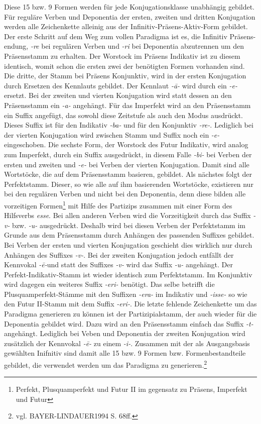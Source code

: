 \documentclass[12pt,abstract=on,titlepage,bibliography=totoc,ngerman,listof=totoc]{scrreprt}
\begin{document}
Diese 15 bzw. 9 Formen werden für jede Konjugationsklasse unabhängig gebildet. Für reguläre Verben und Deponentia der ersten, zweiten und dritten Konjugation werden alle Zeichenkette alleinig aus der Infinitiv-Präsens-Aktiv-Form gebildet. Der erste Schritt auf dem Weg zum vollen Paradigma ist es, die Infinitiv Präsens-endung, \textit{-re} bei regulären Verben und \textit{-ri} bei Deponentia abzutrennen um den Präsensstamm zu erhalten. Der Worstock im Präsens Indikativ ist zu diesem identisch, womit schon die ersten zwei der benötigten Formen vorhanden sind. Die dritte, der Stamm bei Präsens Konjunktiv, wird in der ersten Konjugation durch Ersetzen des Kennlauts gebildet. Der Kennlaut \textit{-ā-} wird durch ein \textit{-e-} ersetzt. Bei der zweiten und vierten Konjugation wird statt dessen an den Präsensstamm ein \textit{-a-} angehängt. Für das Imperfekt wird an den Präsensstamm ein Suffix angefügt, das sowohl diese Zeitstufe als auch den Modus ausdrückt. Dieses Suffix ist für den Indikativ \textit{-ba-} und für den Konjunktiv \textit{-re-}. Lediglich bei der vierten Konjugation wird zwischen Stamm und Suffix noch ein \textit{-e-} eingeschoben. Die sechste Form, der Worstock des Futur Indikativ, wird analog zum Imperfekt, durch ein Suffix ausgedrückt, in diesem Falle \textit{-bi-} bei Verben der ersten und zweiten und \textit{-e-} bei Verben der vierten Konjugation. Damit sind alle Wortstöcke, die auf dem Präsensstamm basieren, gebildet. Als nächstes folgt der Perfektstamm. Dieser, so wie alle auf ihm basierenden Wortstöcke, existieren nur bei den regulären Verben und nicht bei den Deponentia, denn diese bilden alle vorzeitigen Formen\footnote{Perfekt, Plusquamperfekt und Futur II im gegensatz zu Präsens, Imperfekt und Futur} mit Hilfe des Partizips zusammen mit einer Form des Hilfsverbs \textit{esse}. Bei allen anderen Verben wird die Vorzeitigkeit durch das Suffix \textit{-v-} bzw. \textit{-u-} ausgedrückt. Deshalb wird bei diesen Verben der Perfektstamm im Grunde aus dem Präsensstamm durch Anhängen des passenden Suffixes gebildet. Bei Verben der ersten und vierten Konjugation geschieht dies wirklich nur durch Anhängen des Suffixes \textit{-v-}. Bei der zweiten Konjugation jedoch entfällt der Kennvokal \textit{-ē-}und statt des Suffixes \textit{-v-} wird das Suffix \textit{-u-} angehängt. Der Perfekt-Indikativ-Stamm ist wieder identisch zum Perfektstamm. Im Konjunktiv wird dagegen ein weiteres Suffix \textit{-eri-} benötigt. Das selbe betrifft die Plusquamperfekt-Stämme mit den Suffixen \textit{-era-} im Indikativ und \textit{-isse-} so wie den Futur II-Stamm mit dem Suffix \textit{-eri-}. Die letzte fehlende Zeichenkette um das Paradigma generieren zu können ist der Partizipialstamm, der auch wieder für die Deponentia gebildet wird. Dazu wird an den Präsensstamm einfach das Suffix \textit{-t-} angehängt. Lediglich bei Veben und Deponentia der zweiten Konjugation wird zusätzlich der Kennvokal \textit{-ē-} zu einem \textit{-i-}. Zusammen mit der als Ausgangsbasis gewählten Inifnitiv sind damit alle 15 bzw. 9 Formen bzw. Formenbestandteile gebildet, die verwendet werden um das Paradigma zu generieren.\footnote{vgl. BAYER-LINDAUER1994 S. 68ff.} \par
\end{document}
